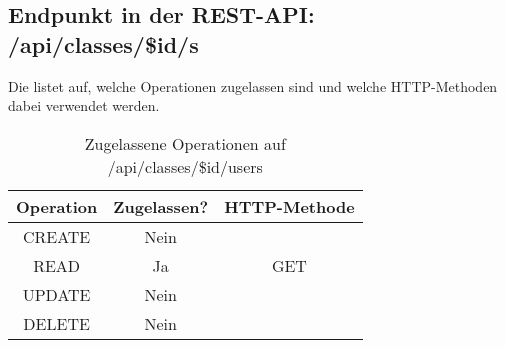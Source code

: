 \subsection{Endpunkt in der REST-API: /api/classes/\$id/s}
Die  listet auf, welche Operationen zugelassen sind und welche HTTP-Methoden dabei verwendet werden. 


\begin{table}[!htbp]
	\begin{tabular}{|c|c|c|}
		\hline
			\textbf{Operation} & \textbf{Zugelassen?} & \textbf{HTTP-Methode} \\ \hline
			CREATE & Nein & \\ \hline 
			READ & Ja & GET \\ \hline
			UPDATE & Nein & \\ \hline 
			DELETE & Nein & \\ \hline
	\end{tabular}

		\caption{Zugelassene Operationen auf /api/classes/\$id/users}
		\label{tab:rest:api:classes:id:users:meth}
\end{table}

